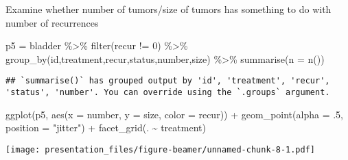 \documentclass[
  ignorenonframetext,
]{beamer}
\newenvironment{Shaded}{\begin{snugshade}}{\end{snugshade}}
\newcommand{\AttributeTok}[1]{\textcolor[rgb]{0.77,0.63,0.00}{#1}}
\newcommand{\DecValTok}[1]{\textcolor[rgb]{0.00,0.00,0.81}{#1}}
\newcommand{\FunctionTok}[1]{\textcolor[rgb]{0.00,0.00,0.00}{#1}}
\newcommand{\NormalTok}[1]{#1}
\newcommand{\OtherTok}[1]{\textcolor[rgb]{0.56,0.35,0.01}{#1}}
\newcommand{\SpecialCharTok}[1]{\textcolor[rgb]{0.00,0.00,0.00}{#1}}
\newcommand{\StringTok}[1]{\textcolor[rgb]{0.31,0.60,0.02}{#1}}
\begin{document}
\begin{frame}[fragile]{Examine whether number of tumors/size of tumors
has something to do with number of recurrences}
\protect\hypertarget{examine-whether-number-of-tumorssize-of-tumors-has-something-to-do-with-number-of-recurrences}{}
\begin{Shaded}
\begin{Highlighting}[]
\NormalTok{p5 }\OtherTok{=}\NormalTok{ bladder }\SpecialCharTok{\%\textgreater{}\%} \FunctionTok{filter}\NormalTok{(recur }\SpecialCharTok{!=} \DecValTok{0}\NormalTok{) }\SpecialCharTok{\%\textgreater{}\%} 
     \FunctionTok{group\_by}\NormalTok{(id,treatment,recur,status,number,size) }\SpecialCharTok{\%\textgreater{}\%} \FunctionTok{summarise}\NormalTok{(}\AttributeTok{n =} \FunctionTok{n}\NormalTok{())}
\end{Highlighting}
\end{Shaded}

\begin{verbatim}
## `summarise()` has grouped output by 'id', 'treatment', 'recur', 'status', 'number'. You can override using the `.groups` argument.
\end{verbatim}

\begin{Shaded}
\begin{Highlighting}[]
\FunctionTok{ggplot}\NormalTok{(p5, }\FunctionTok{aes}\NormalTok{(}\AttributeTok{x =}\NormalTok{ number, }\AttributeTok{y =}\NormalTok{ size, }\AttributeTok{color =}\NormalTok{ recur)) }\SpecialCharTok{+} 
  \FunctionTok{geom\_point}\NormalTok{(}\AttributeTok{alpha =}\NormalTok{ .}\DecValTok{5}\NormalTok{, }\AttributeTok{position =} \StringTok{"jitter"}\NormalTok{) }\SpecialCharTok{+} 
  \FunctionTok{facet\_grid}\NormalTok{(. }\SpecialCharTok{\textasciitilde{}}\NormalTok{ treatment)}
\end{Highlighting}
\end{Shaded}

\texttt{[image: presentation\_files/figure-beamer/unnamed-chunk-8-1.pdf]}
\end{frame}
\end{document}
